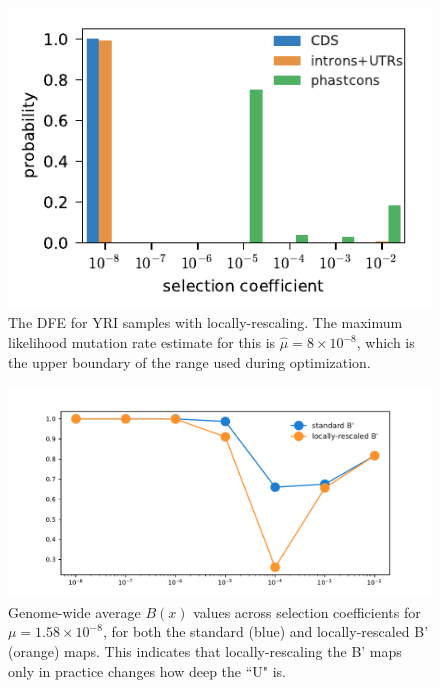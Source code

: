 \documentclass[11pt]{article}
\begin{document}
\begin{figure}[htbp]
  \centering
  \includegraphics[]{figures/supplementary/rescale_DFE.pdf}

  \caption{The DFE for YRI samples with locally-rescaling. The maximum
  likelihood mutation rate estimate for this is $\widehat{\mu} = 8 \times
10^{-8}$, which is the upper boundary of the range used during optimization.}

    \label{suppfig:rescale-dfe}
\end{figure}


\begin{figure}[htbp]
  \centering
  \includegraphics[]{figures/supplementary/b-rescaling-effect.pdf}

  \caption{Genome-wide average $B(x)$ values across selection coefficients for
  $\mu = 1.58 \times 10^{-8}$, for both the standard (blue) and
locally-rescaled B' (orange) maps. This indicates that locally-rescaling the B'
maps only in practice changes how deep the ``U" is.}

    \label{suppfig:rescale-effects}
\end{figure}
\end{document}

